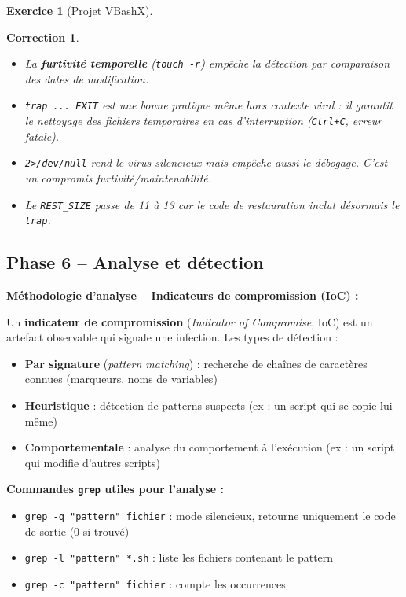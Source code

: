 \documentclass[a4paper,11pt]{article}
\theoremstyle{plain}
\newtheorem{correction}{Correction}
\theoremstyle{definition}
\newtheorem{exercice}{Exercice}
\begin{document}
\begin{exercice}[Projet VBashX]
\begin{correction}
\begin{pointcle}
\begin{itemize}
    \item La \textbf{furtivité temporelle} (\texttt{touch -r}) empêche la détection par comparaison des dates de modification.
    \item \texttt{trap ... EXIT} est une bonne pratique même hors contexte viral : il garantit le nettoyage des fichiers temporaires en cas d'interruption (\texttt{Ctrl+C}, erreur fatale).
    \item \texttt{2>/dev/null} rend le virus silencieux mais empêche aussi le débogage. C'est un compromis furtivité/maintenabilité.
    \item Le \texttt{REST\_SIZE} passe de 11 à 13 car le code de restauration inclut désormais le \texttt{trap}.
\end{itemize}
\end{pointcle}

\end{correction}



\subsection*{Phase 6 -- Analyse et détection}

\begin{rappel}
\textbf{Méthodologie d'analyse -- Indicateurs de compromission (IoC) :}

Un \textbf{indicateur de compromission} (\textit{Indicator of Compromise}, IoC) est un artefact observable qui signale une infection. Les types de détection :
\begin{itemize}
    \item \textbf{Par signature} (\textit{pattern matching}) : recherche de chaînes de caractères connues (marqueurs, noms de variables)
    \item \textbf{Heuristique} : détection de patterns suspects (ex : un script qui se copie lui-même)
    \item \textbf{Comportementale} : analyse du comportement à l'exécution (ex : un script qui modifie d'autres scripts)
\end{itemize}

\textbf{Commandes \texttt{grep} utiles pour l'analyse :}
\begin{itemize}
    \item \texttt{grep -q "pattern" fichier} : mode silencieux, retourne uniquement le code de sortie (0 si trouvé)
    \item \texttt{grep -l "pattern" *.sh} : liste les fichiers contenant le pattern
    \item \texttt{grep -c "pattern" fichier} : compte les occurrences
\end{itemize}
\end{rappel}


\end{exercice}
\end{document}
